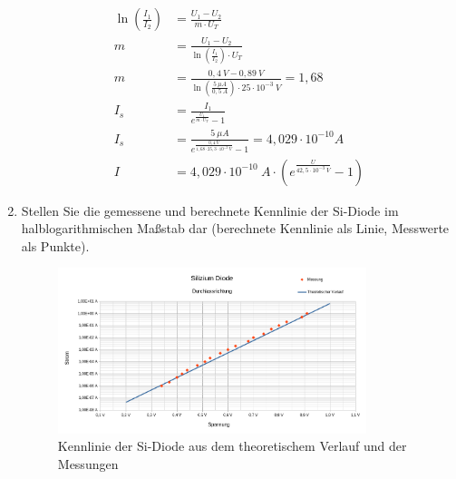 \begin{enumerate}[label=\alph*)]
\begin{align*}
		      \ln\left(\frac{I_1}{I_2}\right)            & =  \frac{U_1-U_2}{m\cdot U_T}                                \\
		      m                                          & =  \frac{U_1-U_2}{\ln\left(\frac{I_1}{I_2}\right) \cdot U_T} \\
		      m                                          & =  \frac{0,4\ V - 0,89\ V}
		      {\ln\left(\frac{5\ \mu A}{0,5\ A}\right) \cdot 25\cdot 10^{-3}\ V} = 1,68                                 \\
		      I_s                                        & = \frac{I_1}{e^\frac{U_1}{m\cdot U_T} - 1}                   \\
		      I_s                                        & = \frac{5\ \mu A}{e^\frac{0,4\ V}
		      {1,68\cdot 25,3\cdot 10^{-3}\ V} - 1} = 4,029\cdot 10^{-10} A                                             \\
		      I                                          & = 4,029\cdot 10^{-10}\ A\cdot
		      \left(e^{\frac{U}{42,5\cdot 10^{-3}\ V}}-1\right)
	      \end{align*}
  \pagebreak

	\item Stellen Sie die gemessene und berechnete Kennlinie der Si-Diode im halblogarithmischen Maßstab dar (berechnete Kennlinie als Linie, Messwerte als Punkte).

	      \begin{figure}[h!]
		      \begin{center}
			      \includegraphics[width=0.85\textwidth]{img/4.1.a.7}
			      \caption{Kennlinie der Si-Diode aus dem theoretischem Verlauf und der Messungen}
		      \end{center}
	      \end{figure}


\end{enumerate}
